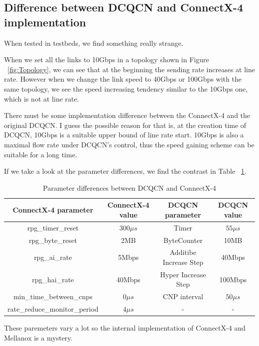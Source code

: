 \documentclass[12pt,a4paper]{article}
\begin{document}
\subsection{Difference between DCQCN and ConnectX-4 implementation}

When tested in testbeds, we find something really strange.

When we set all the links to 10Gbps in a topology shown in Figure ~\ref{fig:Topology},
we can see that at the beginning the sending rate increases at line rate.
However when we change the link speed to 40Gbps or 100Gbps with the same topology,
we see the speed increasing tendency similar to the 10Gbps one, which is not at line rate.

There must be some implementation difference between the ConnectX-4 and the original DCQCN.
I guess the possible reason for that is, at the creation time of DCQCN, 10Gbps is a suitable upper bound of line rate start.
10Gbps is also a maximal flow rate under DCQCN's control, thus the speed gaining scheme can be suitable for a long time.

If we take a look at the parameter differences, we find the contrast in Table ~\ref{tab:contrast}.
\begin{table}[h!]
	\begin{center}
		\caption{Parameter differences between DCQCN and ConnectX-4}
		\label{tab:contrast}
		\begin{tabular}{|c|c|c|c|}
			\hline
			ConnectX-4 parameter & ConnectX-4 value & DCQCN parameter & DCQCN value\\
			\hline
			rpg\_timer\_reset & $300\mu s$ & Timer & $55 \mu s$\\
			\hline
			rpg\_byte\_reset & 2MB & ByteCounter & 10MB\\
			\hline
			rpg\_ai\_rate & 5Mbps & Additibe Increase Step & 40Mbps\\
			\hline
			rpg\_hai\_rate & 40Mbps & Hyper Increase Step & 100Mbps\\
			\hline
			min\_time\_between\_cnps & $0\mu s$ & CNP interval & $50\mu s$\\
			\hline
			rate\_reduce\_monitor\_period & $4\mu s$ & - & - \\
			\hline
		\end{tabular}
	\end{center}
\end{table}

These paremeters vary a lot so the internal implementation of ConnectX-4 and Mellanox is a mystery.
\end{document}
